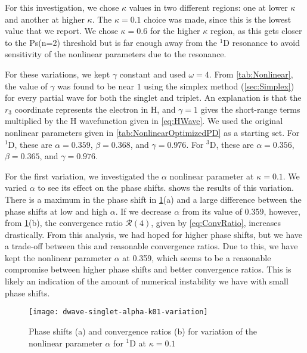 \documentclass[Dissertation.tex]{subfiles}
\begin{document}
For this investigation, we chose $\kappa$ values in two different regions:
one at lower $\kappa$ and another at higher $\kappa$. The $\kappa = 0.1$ choice
was made, since this is the lowest value that we report. We chose $\kappa = 0.6$
for the higher $\kappa$ region, as this gets closer to the Ps(n=2) threshold
but is far enough away from the $^1$D resonance to avoid sensitivity of the
nonlinear parameters due to the resonance.

For these variations, we kept $\gamma$ constant and used $\omega = 4$. From 
\cref{tab:Nonlinear}, the value of $\gamma$ was found to be near $1$ using 
the simplex method (\cref{sec:Simplex}) for every partial wave for both the 
singlet and triplet. An explanation is that the $r_3$ coordinate represents 
the electron in H, and $\gamma = 1$ gives the short-range terms multiplied by 
the H wavefunction given in \cref{eq:HWave}. We used the original nonlinear 
parameters given in \cref{tab:NonlinearOptimizedPD} as a starting set. For
$^1$D, these are $\alpha = 0.359$, $\beta = 0.368$, and $\gamma = 0.976$. For
$^3$D, these are $\alpha = 0.356$, $\beta = 0.365$, and $\gamma = 0.976$.

For the first variation, we investigated the $\alpha$ nonlinear parameter at
$\kappa = 0.1$. We varied $\alpha$ to see its effect on the phase shifts.
 shows the results of this
variation. There is a maximum in the phase shift in 
\cref{fig:dwave-singlet-alpha-k01-variation}(a) and a large difference between
the phase shifts at low and high $\alpha$. If we decrease
$\alpha$ from its value of 0.359, however, from
\cref{fig:dwave-singlet-alpha-k01-variation}(b),
the convergence ratio $\mathcal{R}(4)$, given by \cref{eq:ConvRatio},
increases drastically. From this analysis, we had hoped for higher phase shifts,
but we have a trade-off between this and reasonable convergence ratios. Due to
this, we have kept the nonlinear parameter $\alpha$ at 0.359, which seems to be
a reasonable compromise between higher phase shifts and better convergence
ratios. This is likely an indication of the amount of numerical instability
we have with small phase shifts.


\begin{figure}[H]
	\centering
	\texttt{[image: dwave-singlet-alpha-k01-variation]}
	\caption[Variation of the nonlinear parameter $\alpha$ for $^{1}$D at $\kappa = 0.1$]{Phase shifts (a) and convergence ratios (b) for variation of the nonlinear parameter $\alpha$ for $^{1}$D at $\kappa = 0.1$}
	\label{fig:dwave-singlet-alpha-k01-variation}
\end{figure}
\end{document}
